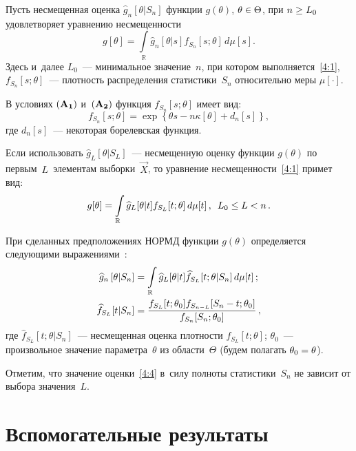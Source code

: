 \begin{multicols}{2}
 Пусть несмещенная оценка $\widehat{g}_n\left[\theta|S_n\right]$
 функции  $g(\theta)$, $\theta\hm\in \Theta$, при $n\hm\ge L_0$
 удовлетворяет уравнению несмещенности
  \begin{equation}
  g[\theta]=\int\limits_{\mathbb{R}} \widehat{g}_n[\theta|s] f_{S_n}[s;\theta] \,d\mu[s].
   \label{4:1}
  \end{equation}
 Здесь и~далее $L_0$~--- минимальное значение~$n$, при котором выполняется~\eqref{4:1},
 $f_{S_n}[s;\theta]$~--- плотность распределения статистики~$S_n$ относительно
 меры $\mu[\cdot]$.

 В условиях $\bf (A_1)$ и~$\bf(A_2)$ функция $f_{S_n}[s;\theta]$ имеет вид:
  \begin{equation*}
   f_{S_n}[s;\theta]=\exp\left\{\theta s-n\kappa[\theta]+d_n[s]\right\},
  \end{equation*}
 где $d_n[s]$~--- некоторая борелевская функция.

 Если использовать $\widehat{g}_{L}[\theta|S_L]$~--- несмещенную оценку функции
 $g(\theta)$ по первым~$L$~элементам выборки~$\vec{X}$,
 то уравнение несмещенности~\eqref{4:1} примет вид:
   \begin{equation}
  g[\theta]=\int\limits_{\mathbb{R}} \widehat{g}_{L}[\theta|t] f_{S_L}[t;\theta]\, d\mu[t]\,,\enskip   L_0\le L <n\,.
   \label{4:3}
   \end{equation}

 При сделанных предположениях НОРМД функции $g(\theta)$ определяется
 следующими выражениями~\cite{1-ch, 4-ch}:
  \begin{align}
  \widehat{g}_n\left[\theta|S_n\right]&=\int\limits_{\mathbb{R}}
   \widehat{g}_{L}[\theta|t] \widehat{f}_{S_L}[t;\theta|S_n]\, d\mu[t]\,;
   \label{4:4}\\
     \widehat{f}_{S_L}[t|S_n]&=\displaystyle\frac{\displaystyle f_{S_L}[t;\theta_0]
    f_{S_{n-L}}[S_n-t;\theta_0]\mathstrut}{\displaystyle f_{S_n}[S_n;\theta_0]\mathstrut}\,,\notag
  \end{align}
  где $\widehat{f}_{S_L}[t;\theta|S_n]$~--- несмещенная оценка плотности
  $f_{S_L}[t;\theta]$; $\theta_0$~--- произвольное значение параметра~$\theta$
  из области~$\Theta$ (будем полагать $\theta_0\hm=\theta$).

 Отметим, что значение оценки~\eqref{4:4} в~силу полноты  статистики~$S_n$ не зависит от выбора значения~$L$.

\section{Вспомогательные результаты}



\end{multicols}
